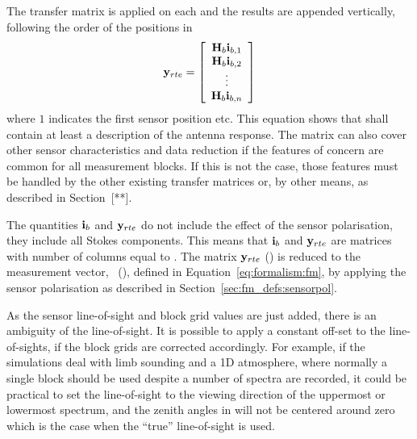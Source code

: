 The transfer matrix  is applied on each  and the
results are appended vertically, following the order of the positions
in 
\begin{equation}
  \mathbf{y}_{rte} = \left[ \begin{array}{c} \mathbf{H}_{b}\mathbf{i}_{{b,1}} \\ 
                                    \mathbf{H}_{b}\mathbf{i}_{{b,2}} \\
                                    \vdots                     \\
                                    \mathbf{H}_{b}\mathbf{i}_{{b,n}} 
            \end{array} \right]
  \label{eq:fm_defs:measseq}
\end{equation}
where $1$ indicates the first sensor position etc. This equation shows
that  shall contain at least a description of the antenna
response. The matrix  can also cover other sensor
characteristics and data reduction if the features of concern are
common for all measurement blocks. If this is not the case, those
features must be handled by the other existing transfer matrices or,
by other means, as described in Section~[**].

The quantities $\mathbf{i}_{b}$ and $\mathbf{y}_{rte}$ do not include the
effect of the sensor polarisation, they include all Stokes components.
This means that $\mathbf{i}_{b}$ and $\mathbf{y}_{rte}$ are matrices with
number of columns equal to . The matrix
$\mathbf{y}_{rte}$ () is reduced to the measurement
vector, \MsrVct\ (), defined in Equation~\ref{eq:formalism:fm}, by
applying the sensor polarisation as described in
Section~\ref{sec:fm_defs:sensorpol}.

As the sensor line-of-sight and block grid values are just added,
there is an ambiguity of the line-of-sight. It is possible to apply a
constant off-set to the line-of-sights, if the block grids are
corrected accordingly. For example, if the simulations deal with limb
sounding and a 1D atmosphere, where normally a single block should be
used despite a number of spectra are recorded, it could be practical
to set the line-of-sight to the viewing direction of the uppermost or
lowermost spectrum, and the zenith angles in 
will not be centered around zero which is the case when the ``true''
line-of-sight is used.

